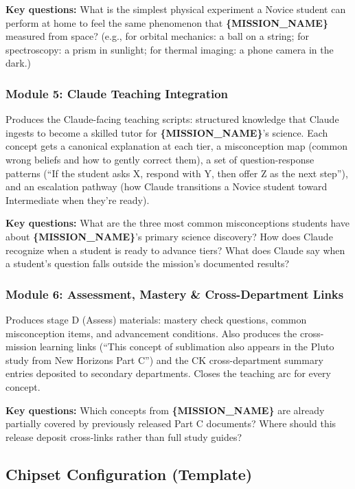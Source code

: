\documentclass[11pt,letterpaper]{article}
\newcommand{\param}[1]{\textcolor{paramred}{\textbf{\{#1\}}}}
\begin{document}
\textbf{Key questions:} What is the simplest physical experiment a Novice student can perform at home to feel the same phenomenon that \param{MISSION\_NAME} measured from space? (e.g., for orbital mechanics: a ball on a string; for spectroscopy: a prism in sunlight; for thermal imaging: a phone camera in the dark.)

\subsubsection{Module 5: Claude Teaching Integration}

Produces the Claude-facing teaching scripts: structured knowledge that Claude ingests to become a skilled tutor for \param{MISSION\_NAME}'s science. Each concept gets a canonical explanation at each tier, a misconception map (common wrong beliefs and how to gently correct them), a set of question-response patterns (``If the student asks X, respond with Y, then offer Z as the next step''), and an escalation pathway (how Claude transitions a Novice student toward Intermediate when they're ready).

\textbf{Key questions:} What are the three most common misconceptions students have about \param{MISSION\_NAME}'s primary science discovery? How does Claude recognize when a student is ready to advance tiers? What does Claude say when a student's question falls outside the mission's documented results?

\subsubsection{Module 6: Assessment, Mastery \& Cross-Department Links}

Produces stage D (Assess) materials: mastery check questions, common misconception items, and advancement conditions. Also produces the cross-mission learning links (``This concept of sublimation also appears in the Pluto study from New Horizons Part C'') and the CK cross-department summary entries deposited to secondary departments. Closes the teaching arc for every concept.

\textbf{Key questions:} Which concepts from \param{MISSION\_NAME} are already partially covered by previously released Part C documents? Where should this release deposit cross-links rather than full study guides?

\subsection{Chipset Configuration (Template)}
\end{document}
